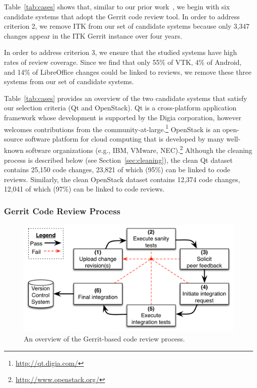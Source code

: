 Table~\ref{tab:cases} shows that, similar to our prior work~\cite{mcintosh2016emse, thongtanunam2016emse}, we begin with six candidate systems that adopt the Gerrit code review tool.
In order to address criterion 2, we remove {\sc ITK} from our set of candidate systems because only 3,347 changes appear in the {\sc ITK} Gerrit instance over four years.

In order to address criterion 3, we ensure that the studied systems have high rates of review coverage.
Since we find that only 55\% of {\sc VTK}, 4\% of {\sc Android}, and 14\% of {\sc LibreOffice} changes could be linked to reviews, we remove these three systems from our set of candidate systems.

Table~\ref{tab:cases} provides an overview of the two candidate systems that satisfy our selection criteria ({\sc Qt} and {\sc OpenStack}).
{\sc Qt} is a cross-platform application framework whose development is supported by the Digia corporation, however welcomes contributions from the community-at-large.\footnote{\url{http://qt.digia.com/}}
{\sc OpenStack} is an open-source software platform for cloud computing that is developed by many well-known software organizations (e.g., IBM, VMware, NEC).\footnote{\url{http://www.openstack.org/}}
Although the cleaning process is described below (see Section~\ref{sec:cleaning}), the clean {\sc Qt} dataset contains 25,150 code changes, 23,821 of which (95\%) can be linked to code reviews.
Similarly, the clean {\sc OpenStack} dataset contains 12,374 code changes, 12,041 of which (97\%) can be linked to code reviews.

\subsubsection{Gerrit Code Review Process}

\begin{figure}
  \centering
  \includegraphics[width=\columnwidth]{figures/contrib_mgmt.pdf}
  \caption{An overview of the Gerrit-based code review process.}
  \label{fig:contrib_mgmt}
\end{figure}

